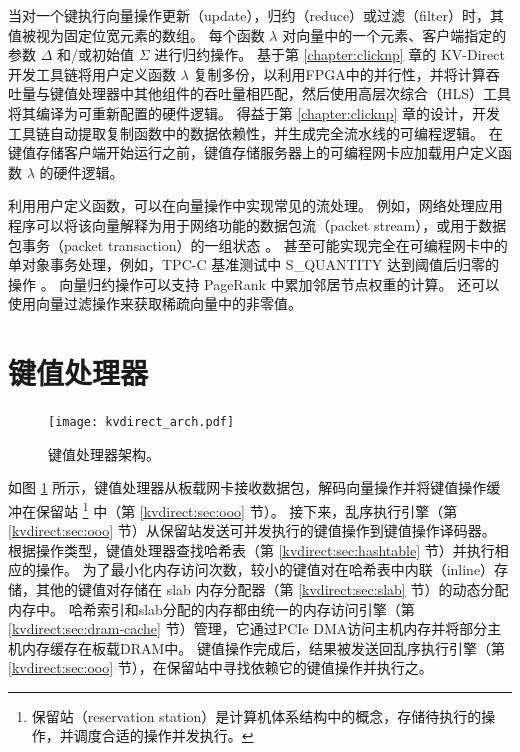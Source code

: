 当对一个键执行向量操作更新（update），归约（reduce）或过滤（filter）时，其值被视为固定位宽元素的数组。
每个函数 $\lambda$ 对向量中的一个元素、客户端指定的参数 $\Delta$ 和/或初始值 $\Sigma$ 进行归约操作。
基于第 \ref{chapter:clicknp} 章的 KV-Direct 开发工具链将用户定义函数 $\lambda$ 复制多份，以利用FPGA中的并行性，并将计算吞吐量与键值处理器中其他组件的吞吐量相匹配，然后使用高层次综合（HLS）工具 \cite {aoc,sdaccel} 将其编译为可重新配置的硬件逻辑。
得益于第 \ref{chapter:clicknp} 章的设计，开发工具链自动提取复制函数中的数据依赖性，并生成完全流水线的可编程逻辑。
在键值存储客户端开始运行之前，键值存储服务器上的可编程网卡应加载用户定义函数 $\lambda$ 的硬件逻辑。

利用用户定义函数，可以在向量操作中实现常见的流处理。
例如，网络处理应用程序可以将该向量解释为用于网络功能的数据包流（packet stream），或用于数据包事务（packet transaction）的一组状态 \cite {sivaraman2016packet}。
甚至可能实现完全在可编程网卡中的单对象事务处理，例如，TPC-C 基准测试中 S\_QUANTITY 达到阈值后归零的操作 \cite {council2010tpc}。
向量归约操作可以支持 PageRank \cite {page1999pagerank} 中累加邻居节点权重的计算。
还可以使用向量过滤操作来获取稀疏向量中的非零值。

\section{键值处理器}
\label{kvdirect:sec:kv-processor}

\begin{figure}[htbp]
\centering
\texttt{[image: kvdirect\_arch.pdf]}
\caption{键值处理器架构。}
\label{kvdirect:fig:kvprocessor-arch}
\end{figure}

如图 \ref {kvdirect:fig:kvprocessor-arch} 所示，键值处理器从板载网卡接收数据包，解码向量操作并将键值操作缓冲在保留站 \footnote{保留站（reservation station）是计算机体系结构中的概念，存储待执行的操作，并调度合适的操作并发执行。} 中（第 \ref {kvdirect:sec:ooo} 节）。
接下来，乱序执行引擎（第 \ref {kvdirect:sec:ooo} 节）从保留站发送可并发执行的键值操作到键值操作译码器。
根据操作类型，键值处理器查找哈希表（第 \ref {kvdirect:sec:hashtable} 节）并执行相应的操作。
为了最小化内存访问次数，较小的键值对在哈希表中内联（inline）存储，其他的键值对存储在 slab 内存分配器（第 \ref {kvdirect:sec:slab} 节）的动态分配内存中。
哈希索引和slab分配的内存都由统一的内存访问引擎（第 \ref {kvdirect:sec:dram-cache} 节）管理，它通过PCIe DMA访问主机内存并将部分主机内存缓存在板载DRAM中。
键值操作完成后，结果被发送回乱序执行引擎（第 \ref {kvdirect:sec:ooo} 节），在保留站中寻找依赖它的键值操作并执行之。

